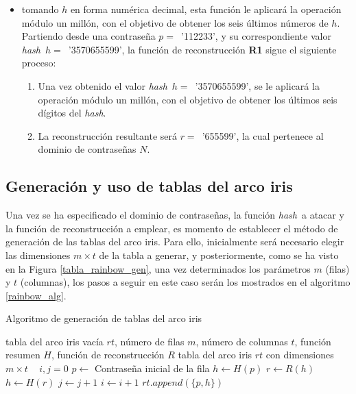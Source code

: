 \documentclass[12pt,spanish,listoffigures,listoftables,listofalgorithms]{tfgetsinf}
\newcommand{\hash}{\textit{hash}}
\begin{document}
\begin{itemize}

	\item tomando $h$ en forma numérica decimal, esta función le aplicará la operación módulo un millón, con el objetivo de obtener los seis últimos números de $h$. Partiendo desde una contraseña $p = $~'112233', y su correspondiente valor \hash~$h = $~'3570655599', la función de reconstrucción \textbf{R1} sigue el siguiente proceso:

		\begin{enumerate}

			\item Una vez obtenido el valor \hash~$h = $~'3570655599', se le aplicará la operación módulo un millón, con el objetivo de obtener los últimos seis dígitos del \hash.

			\item La reconstrucción resultante será $r = $~'655599', la cual pertenece al dominio de contraseñas $N$.

		\end{enumerate}

\end{itemize}

\subsection{Generación y uso de tablas del arco iris}

Una vez se ha especificado el dominio de contraseñas, la función \hash~a atacar y la función de reconstrucción a emplear, es momento de establecer el método de generación de las tablas del arco iris. Para ello, inicialmente será necesario elegir las dimensiones $m \times t$ de la tabla a generar, y posteriormente, como se ha visto en la Figura \ref{tabla_rainbow_gen}, una vez determinados los parámetros $m$ (filas) y $t$ (columnas), los pasos a seguir en este caso serán los mostrados en el algoritmo \ref{rainbow_alg}.

\begin{algorithm}[H]
	\caption{Algoritmo de generación de tablas del arco iris}
	\label{rainbow_alg}
	\begin{algorithmic}
		\REQUIRE tabla del arco iris vacía $rt$, número de filas $m$, número de columnas $t$, función resumen $H$, función de reconstrucción $R$
		\ENSURE tabla del arco iris $rt$ con dimensiones $m \times t$
		\STATE ~
		\STATE $i, j = 0$
			\STATE $p \leftarrow$ Contraseña inicial de la fila
			\STATE $h \leftarrow H(p)$
				\STATE $r \leftarrow R(h)$
				\STATE $h \leftarrow H(r)$
				\STATE $j \leftarrow j + 1$
			\ENDWHILE
			\STATE $i \leftarrow i + 1$
			\STATE $rt.append(\{p, h\})$
		\ENDWHILE
	\end{algorithmic}
\end{algorithm}
\end{document}
